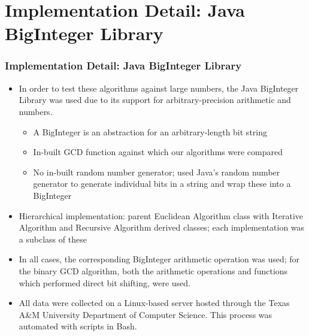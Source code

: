 \documentclass[8pt]{beamer}
\begin{document}
\section{Implementation Detail: Java BigInteger Library}
\begin{frame}
\frametitle{Implementation Detail: Java BigInteger Library}
\begin{itemize} 
\item In order to test these algorithms against large numbers, the Java BigInteger Library was used due to its support for arbitrary-precision arithmetic and numbers.
	\begin{itemize}
	\item A BigInteger is an abstraction for an arbitrary-length bit string
	\item In-built GCD function against which our algorithms were compared
	\item No in-built random number generator; used Java's random number 	generator to generate individual bits in a string and wrap these into a 	BigInteger
	\end{itemize}
\item Hierarchical implementation: parent Euclidean Algorithm class with Iterative Algorithm and Recursive Algorithm derived classes; each implementation was a subclass of these
\item In all cases, the corresponding BigInteger arithmetic operation was used; for the binary GCD algorithm, both the arithmetic operations and functions which performed direct bit shifting, were used.
\item All data were collected on a Linux-based server hosted through the Texas A\&M University Department of Computer Science. This process was automated with scripts in Bash.
\end{itemize}
\end{frame}
\end{document}
